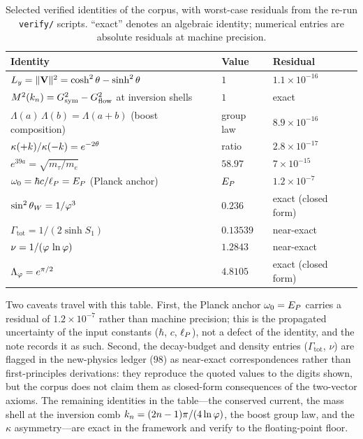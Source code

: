 \begin{table}[htbp]
\centering
\caption{Selected verified identities of the corpus, with worst-case residuals from the
re-run \texttt{verify/} scripts. ``exact'' denotes an algebraic identity; numerical entries
are absolute residuals at machine precision.}
\label{tab:corpus:identities}
\begin{tabular}{lll}
\toprule
Identity & Value & Residual \\
\midrule
$L_{y}=\|\mathbf{V}\|^2=\cosh^2\theta-\sinh^2\theta$ & $1$ & $1.1\times 10^{-16}$ \\
$M^2(k_n)=G_{\mathrm{sym}}^2-G_{\mathrm{flow}}^2$ at inversion shells & $1$ & exact \\
$\Lambda(a)\,\Lambda(b)=\Lambda(a+b)$ (boost composition) & group law & $8.9\times 10^{-16}$ \\
$\kappa(+k)/\kappa(-k)=e^{-2\theta}$ & ratio & $2.8\times 10^{-17}$ \\
$e^{39a}=\sqrt{m_\tau/m_e}$ & $58.97$ & $7\times 10^{-15}$ \\
$\omega_0=\hbar c/\ell_{P}=E_{P}$ (Planck anchor) & $E_{P}$ & $1.2\times 10^{-7}$ \\
$\sin^2\theta_W=1/\varphi^3$ & $0.236$ & exact (closed form) \\
$\Gamma_{\mathrm{tot}}=1/(2\sinh S_1)$ & $0.13539$ & near-exact \\
$\nu=1/(\varphi\,\ln\varphi)$ & $1.2843$ & near-exact \\
$\Lambda_\varphi=e^{\pi/2}$ & $4.8105$ & exact (closed form) \\
\bottomrule
\end{tabular}
\end{table}

Two caveats travel with this table. First, the Planck anchor $\omega_0=E_{P}$ carries a residual
of $1.2\times 10^{-7}$ rather than machine precision; this is the propagated uncertainty of the
input constants ($\hbar$, $c$, $\ell_{P}$), not a defect of the identity, and the note records it as
such. Second, the decay-budget and density entries ($\Gamma_{\mathrm{tot}}$, $\nu$) are flagged
in the new-physics ledger ($98$) as near-exact correspondences rather than first-principles
derivations: they reproduce the quoted values to the digits shown, but the corpus does not
claim them as closed-form consequences of the two-vector axioms. The remaining identities in
the table---the conserved current, the mass shell at the inversion comb $k_n=(2n-1)\pi/(4\ln\varphi)$,
the boost group law, and the $\kappa$ asymmetry---are exact in the framework and verify to the
floating-point floor.
